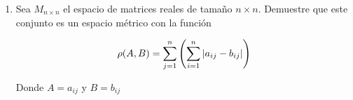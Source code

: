 \documentclass[12pt]{article}
\newcommand{\subscript}[2]{$#1 _ #2$}
\newcommand\Z{\ensuremath{\mathbb{Z}}}
\begin{document}
\begin{enumerate}[label=\textbf{\arabic*}.]
\begin{proof}
\begin{enumerate}[label=(\subscript{D}{{\arabic*}})]
\item Sea $n, m \in \Z^+$ Si $m = n \Rightarrow \rho(n,m) \geqslant 0$. Si $m \neq n \Rightarrow \rho(n,m) \geqslant 0$, ya que 
\begin{equation*}
    \rho(n,m) = 1+\frac{1}{n+m} \geqslant 0
\end{equation*}
\item Se sigue de la definición de $\rho(n,m)$
\item Sea $n, m \in \Z^+$
\begin{equation*}
        \rho(n,m) = 
     \begin{cases}
              0 & \text{si } m = n\\
              1+\frac{1}{n+m} & \text{si } m \neq n
     \end{cases} = \begin{cases}
              0 & \text{si } n = m\\
              1+\frac{1}{m+n} & \text{si } n \neq m 
     \end{cases} 
     = \rho(m,n)
    \end{equation*}
\item Sea $n, m, c \in \Z^+$. Veamos que $\rho(n,c) \leqslant \rho(n,m) + \rho(m,c)$. Supongamos que $n \neq c$, ya que ese caso es trivial.
\begin{equation*}
    \rho(n,c) =  1+\frac{1}{n+c} \leqslant 2+\frac{1}{n+m}+\frac{1}{m+c} 
\end{equation*}
Esto porque $n, m , c \in \Z^+$
\begin{equation*}
    = \left(1+\frac{1}{n+m}\right)+ \left(1+\frac{1}{m+c}\right) = \rho(n,m) + \rho(m,c)
\end{equation*}
\end{enumerate}
$\therefore \rho$ es una métrica en $\Z^+$
\end{proof}

\item Sea $M_{n \times n}$ el espacio de matrices reales de tamaño $n \times n$. Demuestre que este conjunto es un espacio métrico con la función

\begin{equation*}
    \rho (A, B) = \sum_{j=1}^{n} \left(\sum_{i=1}^{n} \abs{{a}_{ij}-{b}_{ij}}\right)
\end{equation*}

Donde $A={a}_{ij}$ y $B={b}_{ij}$


\end{enumerate}
\end{document}
